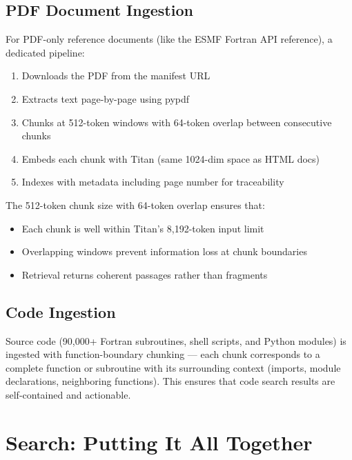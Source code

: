 \documentclass[11pt,letterpaper]{article}
\begin{document}
\subsection{PDF Document Ingestion}

For PDF-only reference documents (like the ESMF Fortran API reference),
a dedicated pipeline:

\begin{enumerate}[nosep]
    \item Downloads the PDF from the manifest URL
    \item Extracts text page-by-page using pypdf
    \item Chunks at 512-token windows with 64-token overlap between
    consecutive chunks
    \item Embeds each chunk with Titan (same 1024-dim space as HTML
    docs)
    \item Indexes with metadata including page number for traceability
\end{enumerate}

The 512-token chunk size with 64-token overlap ensures that:
\begin{itemize}[nosep]
    \item Each chunk is well within Titan's 8,192-token input limit
    \item Overlapping windows prevent information loss at chunk
    boundaries
    \item Retrieval returns coherent passages rather than fragments
\end{itemize}

\subsection{Code Ingestion}

Source code (90,000+ Fortran subroutines, shell scripts, and Python
modules) is ingested with function-boundary chunking — each chunk
corresponds to a complete function or subroutine with its surrounding
context (imports, module declarations, neighboring functions). This
ensures that code search results are self-contained and actionable.

\section{Search: Putting It All Together}
\end{document}
